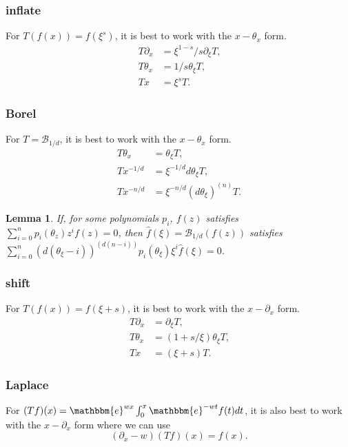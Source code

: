 \documentclass[12pt]{article}
\newcommand{\ee}[0] {\mathbbm{e}}
\numberwithin{equation}{section}
\newtheorem{lemma}[theorem]{Lemma}
\begin{document}
\subsubsection{inflate}
For $T(f(x)) = f(\xi^s)$, it is best to work with the $x-\theta_x$ form.
\begin{align*}
T \partial_x &= \xi^{1-s}/s \partial_{\xi} T\text{,}\\
T \theta_x &= 1/s \theta_{\xi} T \text{,}\\
T x &= \xi^s T\text{.}
\end{align*}

\subsubsection{Borel}
For $T=\mathcal{B}_{1/d}$, it is best to work with the $x-\theta_x$ form.
\begin{align*}
T \theta_x &= \theta_{\xi} T\text{,}\\
T x^{-1/d} &= \xi^{-1/d} d \theta_{\xi} T \text{,}\\
T x^{-n/d} &= 
\xi^{-n/d} (d \theta_\xi)^{(n)} T\text{.}
\end{align*}

\begin{lemma}
If, for some polynomials $p_i$, $f(z)$ satisfies $\sum_{i=0}^{n} p_i(\theta_z) z^i f(z) = 0$,
then $\hat{f}(\xi) = \mathcal{B}_{1/d}(f(z))$ satisfies $\sum_{i=0}^{n}(d (\theta_{\xi}-i))^{(d(n-i))} p_i(\theta_{\xi}) \xi^i \hat{f}(\xi) = 0$.
\end{lemma}


\subsubsection{shift}
For $T(f(x)) = f(\xi+s)$, it is best to work with the $x-\partial_x$ form.
\begin{align*}
T \partial_x &= \partial_{\xi} T\text{,}\\
T \theta_x &= (1+s/\xi) \theta_{\xi} T \text{,}\\
T x &= (\xi+s) T\text{.}
\end{align*}

\subsubsection{Laplace}
For $(Tf)(x) = \ee^{w x}\int_{0}^{x} \ee^{-w t} f(t) dt$, it is also best to work with the $x-\partial_x$ form where we can use
\begin{equation*}
(\partial_{x}- w) (Tf)(x) = f(x)\text{.}
\end{equation*}
\end{document}
